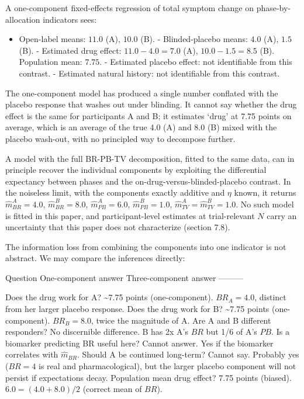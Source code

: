 \documentclass[
  11pt,
]{article}
\providecommand{\tightlist}{%
  \setlength{\itemsep}{0pt}\setlength{\parskip}{0pt}}
\begin{document}
A one-component fixed-effects regression of total symptom change on
phase-by-allocation indicators sees:

\begin{itemize}
\tightlist
\item
  Open-label means: \(11.0\) (A), \(10.0\) (B). - Blinded-placebo means: \(4.0\)
  (A), \(1.5\) (B). - Estimated drug effect: \(11.0 - 4.0 = 7.0\) (A), \(10.0 - 1.5 =
  8.5\) (B). Population mean: \(7.75\). - Estimated placebo effect: not
  identifiable from this contrast. - Estimated natural history: not identifiable
  from this contrast.
\end{itemize}

The one-component model has produced a single number conflated with the
placebo response that washes out under blinding. It cannot say whether the
drug effect is the same for participants A and B; it estimates `drug' at 7.75
points on average, which is an average of the true 4.0 (A) and 8.0 (B) mixed
with the placebo wash-out, with no principled way to decompose further.

A model with the full BR-PB-TV decomposition, fitted to the same data,
can in principle recover the individual components by exploiting the
differential expectancy between phases and the on-drug-versus-blinded-placebo
contrast. In the noiseless limit, with the components exactly additive and
\(\eta\) known, it returns \(\hat{m}_{BR}^A = 4.0\), \(\hat{m}_{BR}^B = 8.0\),
\(\hat{m}_{PB}^A = 6.0\), \(\hat{m}_{PB}^B = 1.0\), \(\hat{m}_{TV}^A =
\hat{m}_{TV}^B = 1.0\). No such model is fitted in this paper, and
participant-level estimates at trial-relevant \(N\) carry an uncertainty
that this paper does not characterize (section 7.8).

The information loss from combining the components into one indicator is not
abstract. We may compare the inferences directly:

Question \textbar{} One-component answer \textbar{} Three-component answer \textbar{} \textbar---\textbar---\textbar---\textbar{} \textbar{}

Does the drug work for A? \textbar{} \textasciitilde7.75 points (one-component). \textbar{} \(BR_A = 4.0\),
distinct from her larger placebo response. \textbar{} \textbar{} Does the drug work for B? \textbar{}
\textasciitilde7.75 points (one-component). \textbar{} \(BR_B = 8.0\), twice the magnitude of A. \textbar{} \textbar{}
Are A and B different responders? \textbar{} No discernible difference. \textbar{} B has 2x A's
\(BR\) but 1/6 of A's \(PB\). \textbar{} \textbar{} Is a biomarker predicting BR useful here? \textbar{}
Cannot answer. \textbar{} Yes if the biomarker correlates with \(\hat{m}_{BR}\). \textbar{} \textbar{}
Should A be continued long-term? \textbar{} Cannot say. \textbar{} Probably yes (\(BR = 4\) is
real and pharmacological), but the larger placebo component will not persist
if expectations decay. \textbar{} \textbar{} Population mean drug effect? \textbar{} 7.75 points
(biased). \textbar{} \(6.0 = (4.0 + 8.0)/2\) (correct mean of \(BR\)). \textbar{}
\end{document}
